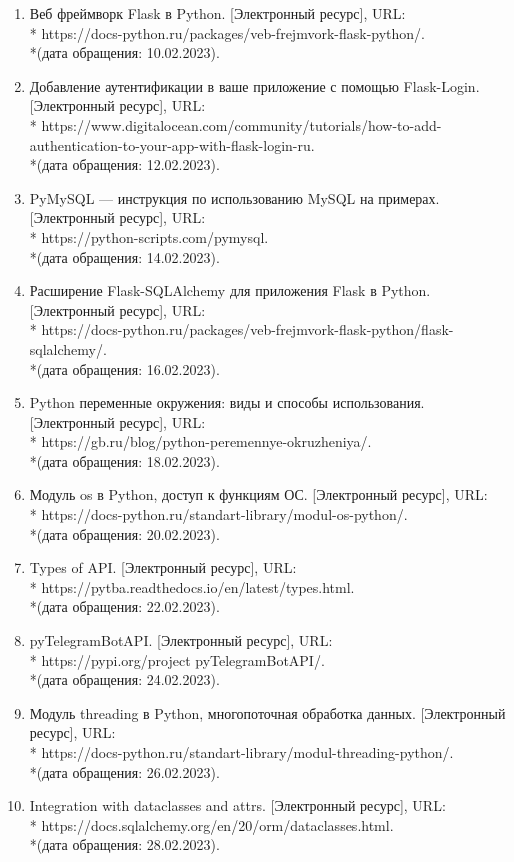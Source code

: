 \documentclass[12pt, oldlfont, amsfonts]{report}
\begin{document}
\begin{enumerate}
\item Веб фреймворк Flask в Python. [Электронный ресурс], URL: \\* https://docs-python.ru/packages/veb-frejmvork-flask-python/.\\*(дата обращения: 10.02.2023).
\item Добавление аутентификации в ваше приложение с помощью Flask-Login. [Электронный ресурс], URL: \\* https://www.digitalocean.com/community/tutorials/how-to-add-authentication-to-your-app-with-flask-login-ru.\\*(дата обращения: 12.02.2023).
\item PyMySQL — инструкция по использованию MySQL на примерах. [Электронный ресурс], URL: \\* https://python-scripts.com/pymysql.\\*(дата обращения: 14.02.2023).
\item Расширение Flask-SQLAlchemy для приложения Flask в Python. [Электронный ресурс], URL: \\* https://docs-python.ru/packages/veb-frejmvork-flask-python/flask-sqlalchemy/.\\*(дата обращения: 16.02.2023).
\item Python переменные окружения: виды и способы использования. [Электронный ресурс], URL: \\* https://gb.ru/blog/python-peremennye-okruzheniya/.\\*(дата обращения: 18.02.2023).
\item Модуль os в Python, доступ к функциям ОС. [Электронный ресурс], URL: \\* https://docs-python.ru/standart-library/modul-os-python/.\\*(дата обращения: 20.02.2023).
\item Types of API. [Электронный ресурс], URL: \\* https://pytba.readthedocs.io/en/latest/types.html.\\*(дата обращения: 22.02.2023).
\item pyTelegramBotAPI. [Электронный ресурс], URL: \\* https://pypi.org/project pyTelegramBotAPI/.\\*(дата обращения: 24.02.2023).
\item Модуль threading в Python, многопоточная обработка данных. [Электронный ресурс], URL: \\* https://docs-python.ru/standart-library/modul-threading-python/.\\*(дата обращения: 26.02.2023).
\item Integration with dataclasses and attrs. [Электронный ресурс], URL: \\* https://docs.sqlalchemy.org/en/20/orm/dataclasses.html.\\*(дата обращения: 28.02.2023).
\end{enumerate}
\end{document}
